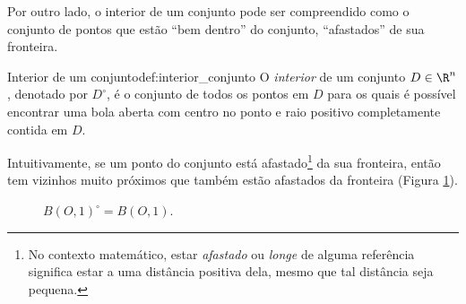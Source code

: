 Por outro lado, o interior de um conjunto pode ser compreendido como o conjunto de pontos que estão ``bem dentro'' do conjunto, ``afastados'' de sua fronteira. 
\begin{definition}{Interior de um conjunto}{def:interior_conjunto}
O  \textit{interior} de um conjunto \(D\in\R^n\), denotado por \(D^\circ\), é o conjunto de todos os pontos em \(D\) para os quais é possível encontrar uma bola aberta com centro no ponto e raio positivo completamente contida em \(D\). 
\begin{comment}
Isto é,
\[D^\circ = \{\Point{x}=(x_1,x_2,\dots, x_n) \in D \,;\, \exists r > 0 \text{ tal que } B(x, r) \subset A\}\]
\end{comment}
\end{definition}

\newpage 
Intuitivamente, se um ponto do conjunto está afastado\footnote{No contexto matemático, estar \textit{afastado} ou \textit{longe} de alguma referência significa estar a uma distância positiva dela, mesmo que tal distância seja pequena.} da sua fronteira, então tem vizinhos muito próximos que também estão afastados da fronteira (Figura \ref{fig:2-circulo_5}). 

\begin{figure}[!htb]
    \centering
{}
\caption{$B(O,1)^\circ=B(O,1)$.}
    \label{fig:2-circulo_5}
  \end{figure}





